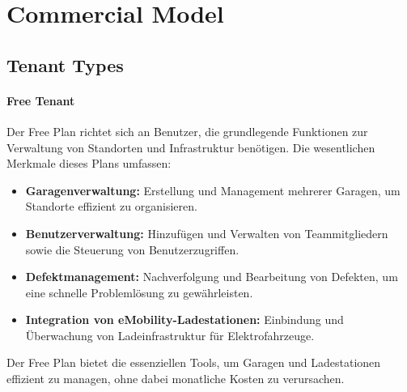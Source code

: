 \section{Commercial Model}
\subsection{Tenant Types}

\paragraph{Free Tenant}
Der Free Plan richtet sich an Benutzer, die grundlegende Funktionen zur Verwaltung von Standorten und Infrastruktur benötigen. Die wesentlichen Merkmale dieses Plans umfassen:
\begin{itemize}
    \item \textbf{Garagenverwaltung:} Erstellung und Management mehrerer Garagen, um Standorte effizient zu organisieren.
    \item \textbf{Benutzerverwaltung:} Hinzufügen und Verwalten von Teammitgliedern sowie die Steuerung von Benutzerzugriffen.
    \item \textbf{Defektmanagement:} Nachverfolgung und Bearbeitung von Defekten, um eine schnelle Problemlösung zu gewährleisten.
    \item \textbf{Integration von eMobility-Ladestationen:} Einbindung und Überwachung von Ladeinfrastruktur für Elektrofahrzeuge.
\end{itemize}
Der Free Plan bietet die essenziellen Tools, um Garagen und Ladestationen effizient zu managen, ohne dabei monatliche Kosten zu verursachen.

